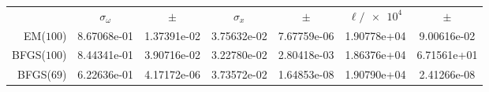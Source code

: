 \begin{tabular}{rS[table-format=1.3,table-omit-exponent]S[table-format=1.1e2]S[table-format=1.3,table-omit-exponent]S[table-format=1.1e2]S[table-format=1.3,table-omit-exponent,fixed-exponent=4]S[table-format=1.1e2]}
\toprule
&&&&&&\\\otoprule
EM($100$)&8.67068e-01&1.37391e-02&3.75632e-02&7.67759e-06&1.90778e+04&9.00616e-02\\
BFGS($100$)&8.44341e-01&3.90716e-02&3.22780e-02&2.80418e-03&1.86376e+04&6.71561e+01\\
BFGS($69$)&6.22636e-01&4.17172e-06&3.73572e-02&1.64853e-08&1.90790e+04&2.41266e-08\\
\bottomrule\end{tabular}
